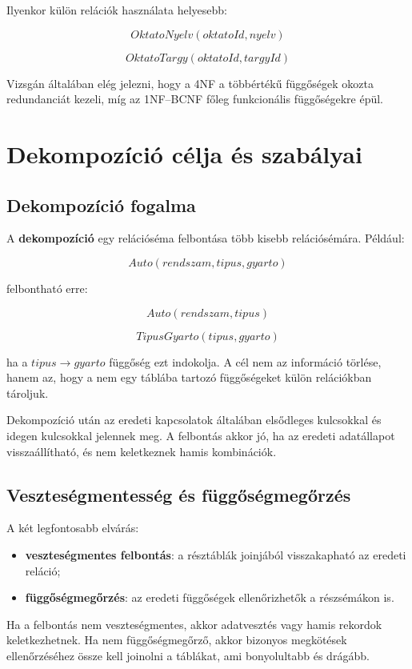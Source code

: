 Ilyenkor külön relációk használata helyesebb:

\[
  OktatoNyelv(oktatoId, nyelv)
\]

\[
  OktatoTargy(oktatoId, targyId)
\]

Vizsgán általában elég jelezni, hogy a 4NF a többértékű függőségek okozta redundanciát kezeli, míg az 1NF--BCNF főleg funkcionális függőségekre épül.

\section{Dekompozíció célja és szabályai}

\subsection{Dekompozíció fogalma}

A \textbf{dekompozíció} egy relációséma felbontása több kisebb relációsémára. Például:

\[
  Auto(rendszam, tipus, gyarto)
\]

felbontható erre:

\[
  Auto(rendszam, tipus)
\]

\[
  TipusGyarto(tipus, gyarto)
\]

ha a \(tipus \to gyarto\) függőség ezt indokolja. A cél nem az információ törlése, hanem az, hogy a nem egy táblába tartozó függőségeket külön relációkban tároljuk.

Dekompozíció után az eredeti kapcsolatok általában elsődleges kulcsokkal és idegen kulcsokkal jelennek meg. A felbontás akkor jó, ha az eredeti adatállapot visszaállítható, és nem keletkeznek hamis kombinációk.

\subsection{Veszteségmentesség és függőségmegőrzés}

A két legfontosabb elvárás:

\begin{itemize}
  \item \textbf{veszteségmentes felbontás}: a résztáblák joinjából visszakapható az eredeti reláció;
  \item \textbf{függőségmegőrzés}: az eredeti függőségek ellenőrizhetők a részsémákon is.
\end{itemize}

Ha a felbontás nem veszteségmentes, akkor adatvesztés vagy hamis rekordok keletkezhetnek. Ha nem függőségmegőrző, akkor bizonyos megkötések ellenőrzéséhez össze kell joinolni a táblákat, ami bonyolultabb és drágább.

